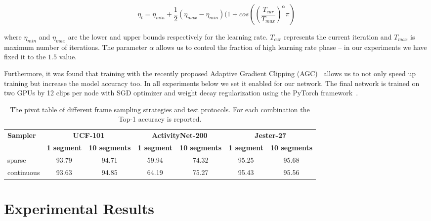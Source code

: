 \documentclass[twoside, twocolumn]{article}
\begin{document}
\begin{equation}
\label{eq:lr_schedule}
\eta_t=\eta_{min} + \frac{1}{2}(\eta_{max} - \eta_{min})(1 + cos\left(\left(\frac{T_{cur}}{T_{max}}\right)^{\alpha} \pi \right)
\end{equation}

\noindent where $\eta_{min}$ and $\eta_{max}$ are the lower and upper bounds respectively for the learning rate.
$T_{cur}$ represents the current iteration and $T_{max}$ is maximum number of iterations. The parameter $\alpha$
allows us to control the fraction of high learning rate phase -- in our experiments we have fixed it to the $1.5$ value.

Furthermore, it was found that training with the recently proposed Adaptive Gradient Clipping (AGC)~\cite{AGC} allows us
to not only speed up training but increase the model accuracy too. In all experiments below we set it enabled for our
network. The final network is trained on two GPUs by 12 clips per node with SGD optimizer and weight decay
regularization using the PyTorch framework~\cite{PyTorch}.



\begin{table*}[t]
\caption{The pivot table of different frame sampling strategies and test protocols. For each combination the Top-1
accuracy is reported.}
\label{table:ablation_samplers}
\centering
\begin{tabular}{l|cc|cc|cc}
\multirow{2}{*}{\textbf{Sampler}}& \multicolumn{2}{c|}{\textbf{UCF-101}}     & \multicolumn{2}{c|}{\textbf{ActivityNet-200}} & \multicolumn{2}{c}{\textbf{Jester-27}}    \\
                                 & \textbf{1 segment} & \textbf{10 segments} & \textbf{1 segment}   & \textbf{10 segments}   & \textbf{1 segment} & \textbf{10 segments} \\ \hline
sparse                           & 93.79              & 94.71                & 59.94                & 74.32                  & 95.25              & 95.68                \\
continuous                       & 93.63              & 94.85                & 64.19                & 75.27                  & 95.43              & 95.56
\end{tabular}
\end{table*}

\section{Experimental Results}
\end{document}
